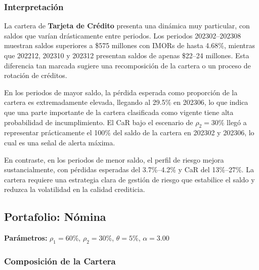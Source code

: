 \subsubsection{Interpretación}

La cartera de \textbf{Tarjeta de Crédito} presenta una dinámica muy particular, con saldos que varían drásticamente entre periodos. Los periodos 202302--202308 muestran saldos superiores a \$575 millones con IMORs de hasta 4.68\%, mientras que 202212, 202310 y 202312 presentan saldos de apenas \$22--24 millones. Esta diferencia tan marcada sugiere una recomposición de la cartera o un proceso de rotación de créditos.

En los periodos de mayor saldo, la pérdida esperada como proporción de la cartera es extremadamente elevada, llegando al 29.5\% en 202306, lo que indica que una parte importante de la cartera clasificada como vigente tiene alta probabilidad de incumplimiento. El CaR bajo el escenario de $\rho_2 = 30\%$ llegó a representar prácticamente el 100\% del saldo de la cartera en 202302 y 202306, lo cual es una señal de alerta máxima.

En contraste, en los periodos de menor saldo, el perfil de riesgo mejora sustancialmente, con pérdidas esperadas del 3.7\%--4.2\% y CaR del 13\%--27\%. La cartera requiere una estrategia clara de gestión de riesgo que estabilice el saldo y reduzca la volatilidad en la calidad crediticia.

\newpage

\subsection{Portafolio: Nómina}

\textbf{Parámetros:} $\rho_1 = 60\%$, $\rho_2 = 30\%$, $\theta = 5\%$, $\alpha = 3.00$

\subsubsection{Composición de la Cartera}

